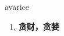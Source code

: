 
\begin{frame}
{\huge avarice}
\begin{center}
\begin{enumerate}\Large
  \item \textbf{贪财，贪婪}
\end{enumerate}
\end{center}
\end{frame}

